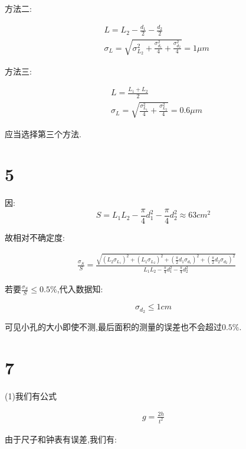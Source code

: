 \documentclass[a4paper,10pt,notitlepage]{report}
\begin{document}
	方法二:
	
\begin{align}
	&L = L_2 - \frac{d_1}{2} - \frac{d_2}{2} \\
	&\sigma_L = \sqrt{\sigma_{L_2}^2 + \frac{\sigma_{d_1}^2}{4} + \frac{\sigma_{d_2}^2}{4} } = 1 \mu m
\end{align}

	方法三:
	
\begin{align}
	&L = \frac{L_1 + L_2}{2} \\
	&\sigma_L = \sqrt{\frac{\sigma_{L_1}^2}{4} + \frac{\sigma_{L_2}^2}{4} } = 0.6 \mu m
\end{align}

	应当选择第三个方法.
	
\section*{5}

	因: \\
	
\begin{equation}
	S = L_1 L_2 - \frac{\pi}{4} d_1^2 - \frac{\pi}{4} d_2 ^ 2 \approx 63 cm^2	
\end{equation}

	故相对不确定度:

\begin{align}
	&\frac{\sigma_S}{S} = \frac{\sqrt{(L_2\sigma_{L_1})^2+(L_1\sigma_{L_2})^2+(\frac{\pi}{2}d_1\sigma_{d_1})^2+(\frac{\pi}{2}d_2\sigma_{d_2})^2}}{L_1 L_2 - \frac{\pi}{4} d_1^2 - \frac{\pi}{4} d_2 ^ 2} 	
\end{align}

	若要$\frac{\sigma_S}{S}\leq0.5\%$,代入数据知:

\begin{equation}
	\sigma_{d_2}\leq 1 cm
\end{equation}

	可见小孔的大小即使不测,最后面积的测量的误差也不会超过$0.5\%$.
	
\section*{7}

	(1)我们有公式
	
\begin{align}
	g = \frac{2h}{t^2}
\end{align}

	由于尺子和钟表有误差,我们有:
\end{document}
